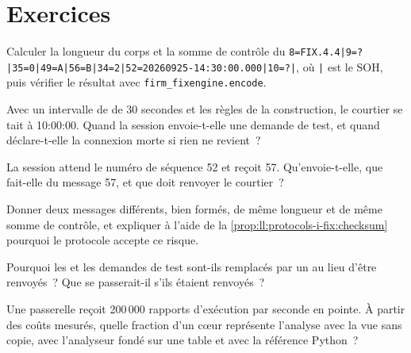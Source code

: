 \section{Exercices}

\begin{exercise}[$\star$]\label{exo:ll:protocols-i-fix:1}
Calculer la longueur du corps et la somme de contrôle du  \texttt{8=FIX.4.4|9=?|35=0|49=A|56=B|34=2|52=20260925-14:30:00.000|10=?|},
où \texttt{|} est le SOH, puis vérifier le résultat avec \texttt{firm\_fixengine.encode}.
\end{exercise}

\begin{exercise}[$\star$]\label{exo:ll:protocols-i-fix:2}
Avec un intervalle de  de 30 secondes et les règles de la construction, le courtier se tait à 10:00:00. Quand la session envoie-t-elle une
demande de test, et quand déclare-t-elle la connexion morte si rien ne revient~?
\end{exercise}

\begin{exercise}[$\star$]\label{exo:ll:protocols-i-fix:3}
La session attend le numéro de séquence 52 et reçoit 57. Qu'envoie-t-elle, que fait-elle du message 57, et que doit
renvoyer le courtier~?
\end{exercise}

\begin{exercise}[$\star\star$]\label{exo:ll:protocols-i-fix:4}
Donner deux messages différents, bien formés, de même longueur et de même somme de contrôle, et expliquer à l'aide de la
\cref{prop:ll:protocols-i-fix:checksum} pourquoi le protocole accepte ce risque.
\end{exercise}

\begin{exercise}[$\star\star$]\label{exo:ll:protocols-i-fix:5}
Pourquoi les  et les demandes de test sont-ils remplacés par un  au lieu d'être renvoyés~? Que se passerait-il s'ils étaient renvoyés~?
\end{exercise}

\begin{exercise}[$\star\star$]\label{exo:ll:protocols-i-fix:6}
Une passerelle reçoit 200\,000 rapports d'exécution par seconde en pointe. À partir des coûts mesurés, quelle fraction d'un cœur représente
l'analyse avec la vue sans copie, avec l'analyseur fondé sur une table et avec la référence Python~?
\end{exercise}


